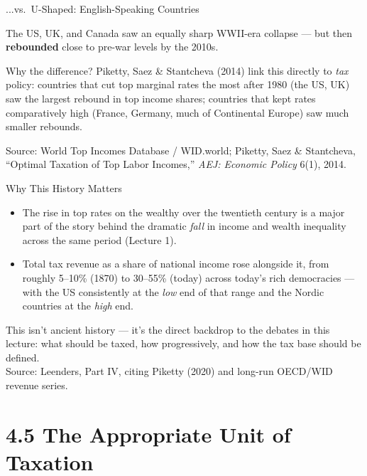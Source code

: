 \documentclass[11pt,aspectratio=169]{beamer}
\newcommand{\srcnote}[1]{{\footnotesize\color{wugray}Source: #1}}
\begin{document}
\begin{frame}{...vs.\ U-Shaped: English-Speaking Countries}
  \begin{center}
  \end{center}
  \footnotesize
  The US, UK, and Canada saw an equally sharp WWII-era collapse --- but then \textbf{rebounded} close to pre-war levels by the 2010s.
  \vspace{0.3em}
  \begin{alertblock}{Why the difference?}
    Piketty, Saez \& Stantcheva (2014) link this directly to \emph{tax} policy: countries that cut top marginal rates the most after 1980 (the US, UK) saw the largest rebound in top income shares; countries that kept rates comparatively high (France, Germany, much of Continental Europe) saw much smaller rebounds.
  \end{alertblock}
  \srcnote{World Top Incomes Database / WID.world; Piketty, Saez \& Stantcheva, ``Optimal Taxation of Top Labor Incomes,'' \emph{AEJ: Economic Policy} 6(1), 2014.}
\end{frame}

\begin{frame}{Why This History Matters}
  \begin{itemize}
    \item The rise in top rates on the wealthy over the twentieth century is a major part of the story behind the dramatic \emph{fall} in income and wealth inequality across the same period (Lecture 1).
    \item Total tax revenue as a share of national income rose alongside it, from roughly 5--10\% (1870) to 30--55\% (today) across today's rich democracies --- with the US consistently at the \emph{low} end of that range and the Nordic countries at the \emph{high} end.
  \end{itemize}
  \vspace{0.3em}
  \centering
  \alert{This isn't ancient history --- it's the direct backdrop to the debates in this lecture: what should be taxed, how progressively, and how the tax base should be defined.}\\
  \srcnote{Leenders, Part IV, citing Piketty (2020) and long-run OECD/WID revenue series.}
\end{frame}

\section{4.5 The Appropriate Unit of Taxation}
\end{document}
